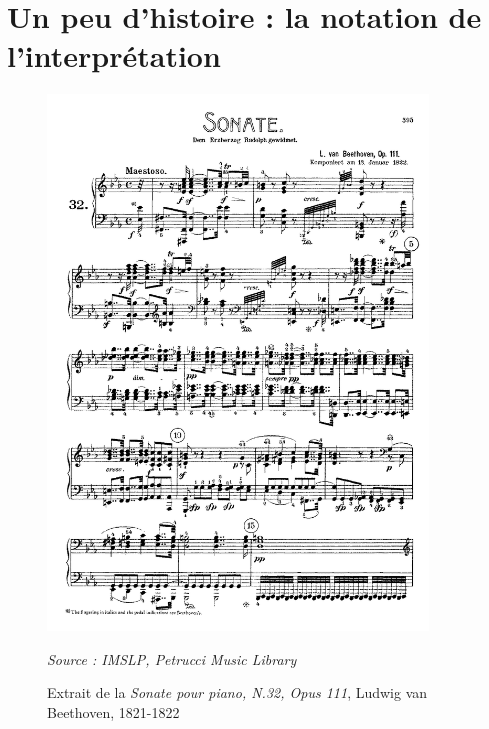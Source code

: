 \section{Un peu d'histoire : la notation de l'interprétation}
\label{sec:exempleNotationInterpretation}
\begin{figure}[!htbp]
	\centering
	\includegraphics[keepaspectratio=true, width=0.9\textwidth]{Annexes/i/exempleNotationInterpretation.png}
	\caption{Extrait de la \textit{Sonate pour piano, N.32, Opus 111}, Ludwig van Beethoven, 1821-1822}
	\medskip
	\small
	\textit{Source : IMSLP, Petrucci Music Library} 	
	\label{fig:exempleNotationInterpretation}
\end{figure}

